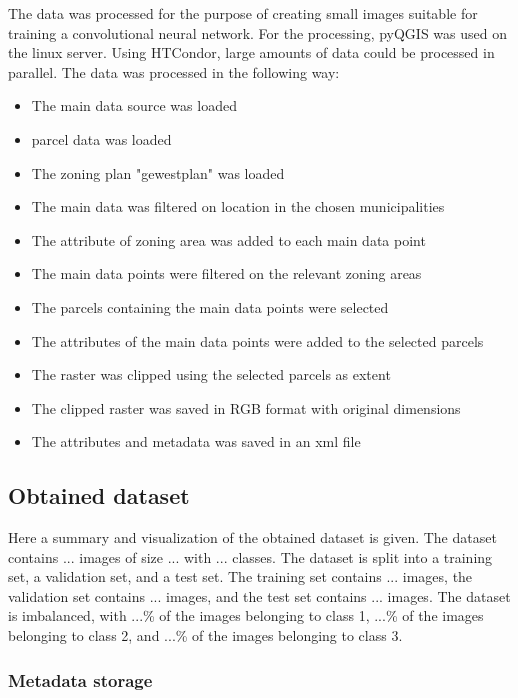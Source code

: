The data was processed for the purpose of creating small images suitable for training a convolutional neural network.
For the processing, pyQGIS was used on the linux server. Using HTCondor, large amounts of data could be processed in parallel.
The data was processed in the following way:
\begin{itemize}
    \item The main data source was loaded
    \item parcel data was loaded
    \item The zoning plan "gewestplan" was loaded
    \item The main data was filtered on location in the chosen municipalities
    \item The attribute of zoning area was added to each main data point
    \item The main data points were filtered on the relevant zoning areas
    \item The parcels containing the main data points were selected
    \item The attributes of the main data points were added to the selected parcels
    \item The raster was clipped using the selected parcels as extent
    \item The clipped raster was saved in RGB format with original dimensions
    \item The attributes and metadata was saved in an xml file
\end{itemize}



\subsection{Obtained dataset}

Here a summary and visualization of the obtained dataset is given. The dataset contains ... images of size ... with ... classes. The dataset is split into a training set, a validation set, and a test set. The training set contains ... images, the validation set contains ... images, and the test set contains ... images. The dataset is imbalanced, with ...\% of the images belonging to class 1, ...\% of the images belonging to class 2, and ...\% of the images belonging to class 3.

\subsubsection{Metadata storage}

